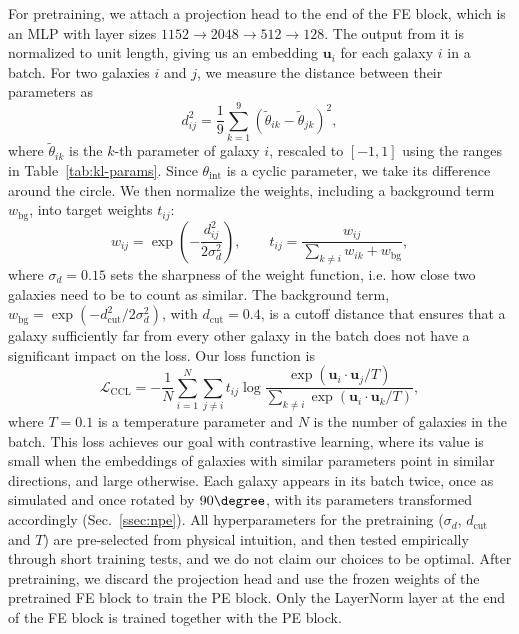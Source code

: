 For pretraining, we attach a projection head to the end of the FE block, which is an MLP with layer sizes $1152 \to 2048 \to 512 \to 128$. The output from it is normalized to unit length, giving us an embedding $\mathbf{u}_i$ for each galaxy $i$ in a batch. For two galaxies $i$ and $j$, we measure the distance between their parameters as
\begin{equation}
\label{eqn:ccl-distance}
    d_{ij}^2 = \frac{1}{9}\sum_{k=1}^{9}\left(\tilde{\theta}_{ik} - \tilde{\theta}_{jk}\right)^2,
\end{equation}
where $\tilde{\theta}_{ik}$ is the $k$-th parameter of galaxy $i$, rescaled to $[-1, 1]$ using the ranges in Table~\ref{tab:kl-params}. Since $\theta_\mathrm{int}$ is a cyclic parameter, we take its difference around the circle. We then normalize the weights, including a background term $w_\mathrm{bg}$, into target weights $t_{ij}$:
\begin{equation}
\label{eqn:ccl-target}
    w_{ij} = \exp\left(-\frac{d_{ij}^2}{2\sigma_d^2}\right), \qquad
    t_{ij} = \frac{w_{ij}}{\sum_{k\neq i} w_{ik} + w_\mathrm{bg}},
\end{equation}
where $\sigma_d = 0.15$ sets the sharpness of the weight function, i.e. how close two galaxies need to be to count as similar. The background term, $w_\mathrm{bg} = \exp\left(-d_\mathrm{cut}^2/2\sigma_d^2\right)$, with $d_\mathrm{cut}=0.4$, is a cutoff distance that ensures that a galaxy sufficiently far from every other galaxy in the batch does not have a significant impact on the loss. Our loss function is
\begin{equation}
\label{eqn:ccl-loss}
    \mathcal{L}_\mathrm{CCL} = -\frac{1}{N}\sum_{i=1}^{N}\sum_{j\neq i} t_{ij}\log\frac{\exp(\mathbf{u}_i\cdot\mathbf{u}_j/T)}{\sum_{k\neq i}\exp(\mathbf{u}_i\cdot\mathbf{u}_k/T)},
\end{equation}
where $T=0.1$ is a temperature parameter and $N$ is the number of galaxies in the batch. This loss achieves our goal with contrastive learning, where its value is small when the embeddings of galaxies with similar parameters point in similar directions, and large otherwise. Each galaxy appears in its batch twice, once as simulated and once rotated by $90\degree$, with its parameters transformed accordingly (Sec.~\ref{ssec:npe}). All hyperparameters for the pretraining ($\sigma_d$, $d_\mathrm{cut}$ and $T$) are pre-selected from physical intuition, and then tested empirically through short training tests, and we do not claim our choices to be optimal. After pretraining, we discard the projection head and use the frozen weights of the pretrained FE block to train the PE block. Only the LayerNorm layer at the end of the FE block is trained together with the PE block.

